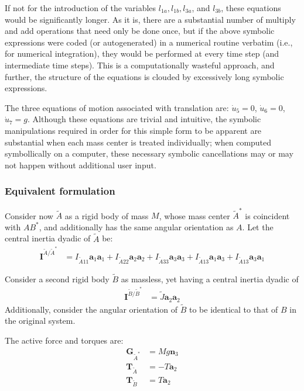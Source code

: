 \documentclass[letterpaper,11pt]{article}
\newcommand{\bs}[1]{ \boldsymbol{ #1 } }
\begin{document}
If not for the introduction of the variables $l_{1a}, l_{1b}, l_{3a}$, and
$l_{3b}$, these equations would be significantly longer. As it is, there are a
substantial number of multiply and add operations that need only be done once,
but if the above symbolic expressions were coded (or autogenerated) in a
numerical routine verbatim (i.e., for numerical integration), they would be
performed at every time step (and intermediate time steps).  This is a
computationally wasteful approach, and further, the structure of the equations
is clouded by excessively long symbolic expressions.

The three equations of motion associated with translation are:
$\dot{u}_5 = 0$, $\dot{u}_6 = 0$, $\dot{u}_7 = g$.  Although these equations
are trivial and intuitive, the symbolic manipulations required in order for
this simple form to be apparent are substantial when each mass center is treated
individually; when computed symbollically on a computer, these necessary
symbolic cancellations may or may not happen without additional user input.

\subsubsection*{Equivalent formulation}
Consider now $\tilde{A}$ as a rigid body of mass $M$, whose mass center
$\tilde{A}^*$ is coincident with $AB^*$, and additionally has the same angular
orientation as $A$.
Let the central inertia dyadic of $\tilde{A}$ be:
\begin{align*}
  \bs{I}^{\tilde{A}/\tilde{A}^*} & = I_{\tilde{A}11}\bs{a}_1\bs{a}_1 + I_{\tilde{A}22}\bs{a}_2\bs{a}_2 +
  I_{\tilde{A}33}\bs{a}_3\bs{a}_3 + I_{\tilde{A}13}\bs{a}_1\bs{a}_3 + I_{\tilde{A}13}\bs{a}_3\bs{a}_1
\end{align*}

Consider a second rigid body $\tilde{B}$ as massless, yet having a central inertia
dyadic of
\begin{align*}
  \bs{I}^{\tilde{B}/\tilde{B}^*} & = \tilde{J}\bs{a}_2\bs{a}_2
\end{align*}
Additionally, consider the angular orientation of $\tilde{B}$ to be identical
to that of $B$ in the original system.

The active force and torques are:
\begin{align*}
  \bs{G}_{\tilde{A}^*} & = Mg\bs{n}_3 \\
  \bs{T}_{\tilde{A}} & = - T \bs{a}_2 \\
  \bs{T}_{\tilde{B}} & = T \bs{a}_2
\end{align*}
\end{document}
